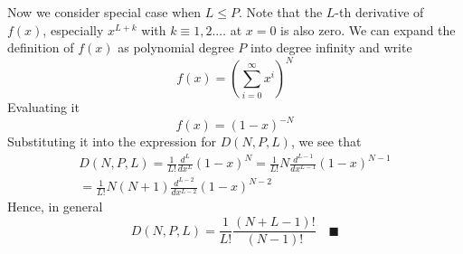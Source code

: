 \documentclass[../../../main.tex]{subfiles}
\begin{document}
Now we consider special case when $L\leq P$. Note that the $L$-th derivative of $f(x) $, especially $x^{L+k}$ with $k\equiv 1,2.\dots$ at $x=0$ is also zero. We can expand the definition of $f(x)$ as polynomial degree $P$ into degree infinity and write
\begin{equation*}
    f(x)=\left(\sum^{\infty}_{i=0}x^i\right)^N
\end{equation*}
Evaluating it
\begin{equation*}
    f(x)=(1-x)^{-N}
\end{equation*}
Substituting it into the expression for $D(N,P,L)$, we see that
\begin{multline*}
    D(N,P,L)=\frac{1}{L!}\frac{d^L}{dx^L}(1-x)^N =\frac{1}{L!}N\frac{d^{L-1}}{dx^{L-1}}(1-x)^{N-1}\\ =\frac{1}{L!} N(N+1) \frac{d^{L-2}}{dx^{L-2}}(1-x)^{N-2}
\end{multline*}
Hence, in general
\begin{equation*}
    D(N,P,L)=\frac{1}{L!}\frac{(N+L-1)!}{(N-1)!}\quad \blacksquare
\end{equation*}
\end{document}
